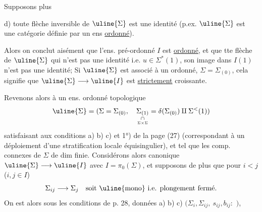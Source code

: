 Supposons  plus

d) toute flèche inversible de $\uline{\Sigma}$ est une identité
(p.ex. $\uline{\Sigma}$ est une catégorie définie par un ens
\uline{ordonné}).

Alors on conclut aisément que l'ens. pré-ordonné $I$ est
\uline{ordonné}, et que tte flèche de $\uline{\Sigma}$ qui n'est pas
une identité i.e. $u\in\Sigma^{*}(1)$, son image dans $I(1)$
n'est pas une identité;
 Si $\uline{\Sigma}$ est associé à un
ordonné, $\Sigma=\Sigma_{(0)}$, cela signifie que
$\uline{\Sigma}\longrightarrow\uline{I}$ est 
\uline{strictement} croissante.

Revenons alors à un  ens. ordonné topologique
\[
\uline{\Sigma}=(\Sigma=\Sigma_{(0)},\quad
\underset{\underset{\Sigma\times\Sigma}{\cap}}{\Sigma_{(1)}}
=\delta(\Sigma_{(0)})\amalg\Sigma^{<}(1))
\]
satisfaisant aux conditions a) b) c) et 1°) de la page (27)
(correspondant  à un déploiement d'une
stratification locale équisingulier), et tel que les comp. connexes
de $\Sigma$  de dim finie.
Considérons alors  
canonique $\uline{\Sigma}\longrightarrow\uline{I}$ avec $I=\pi_0(\Sigma)$,
et supposons de plus que pour $i<j$ ($i,j\in I$)
\[
\Sigma_{ij}\longrightarrow\Sigma_j\quad\hbox{soit \uline{mono} i.e. plongement fermé.}
\]
On est alors sous les conditions de p. 28,
données a) b) c)
$(\Sigma_i,\Sigma_{ij},\ s_{ij},b_{ij}:$
$)$,
